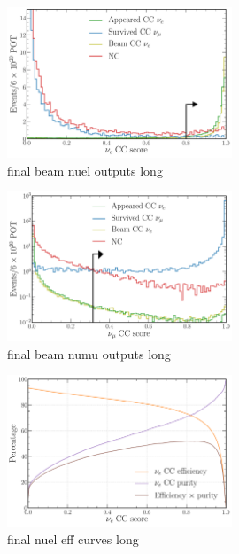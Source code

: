 \begin{figure} %
    \includegraphics[width=0.6\textwidth]{diagrams/6-cvn/chipsnet/final_beam_nuel_outputs.pdf}
    \caption[final beam nuel outputs short]
    {final beam nuel outputs long}
    \label{fig:final_beam_nuel_outputs}
\end{figure}

\begin{figure} %
    \includegraphics[width=0.6\textwidth]{diagrams/6-cvn/chipsnet/final_beam_numu_outputs.pdf}
    \caption[final beam numu outputs short]
    {final beam numu outputs long}
    \label{fig:final_beam_numu_outputs}
\end{figure}

\begin{figure} %
    \includegraphics[width=0.6\textwidth]{diagrams/6-cvn/chipsnet/final_nuel_eff_curves.pdf}
    \caption[final nuel eff curves short]
    {final nuel eff curves long}
    \label{fig:final_nuel_eff_curves}
\end{figure}

